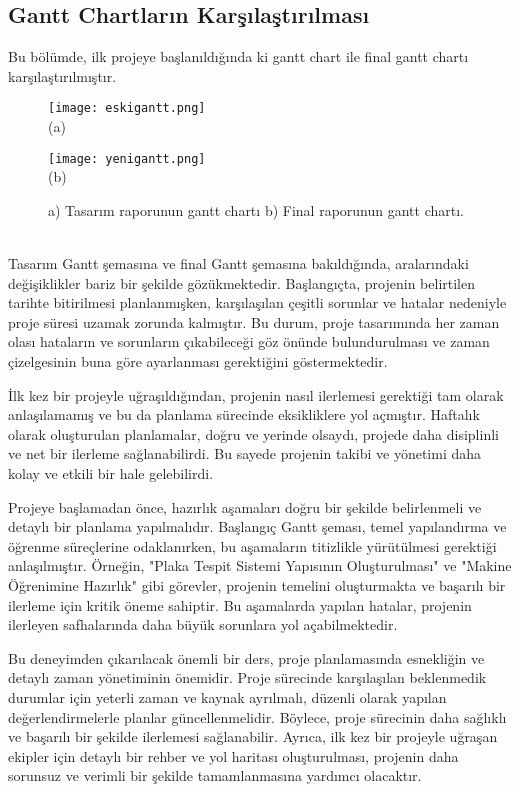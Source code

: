 \documentclass[]{article}
\begin{document}
	\subsection{Gantt Chartların Karşılaştırılması}
	Bu bölümde, ilk projeye başlanıldığında ki gantt chart ile final gantt chartı karşılaştırılmıştır.
	\begin{figure}[!ht]
		\centering
		\texttt{[image: eskigantt.png]}
		\\
		(a)
	\end{figure}
	\begin{figure}[!ht]
		\centering
		\texttt{[image: yenigantt.png]}
		\\
		 (b)
		\caption{
			{a) Tasarım raporunun gantt chartı}
			{b) Final raporunun gantt chartı.}}
	\end{figure}
	\\
	Tasarım Gantt şemasına ve final Gantt şemasına bakıldığında, aralarındaki değişiklikler bariz bir şekilde gözükmektedir. Başlangıçta, projenin belirtilen tarihte bitirilmesi planlanmışken, karşılaşılan çeşitli sorunlar ve hatalar nedeniyle proje süresi uzamak zorunda kalmıştır. Bu durum, proje tasarımında her zaman olası hataların ve sorunların çıkabileceği göz önünde bulundurulması ve zaman çizelgesinin buna göre ayarlanması gerektiğini göstermektedir.

	İlk kez bir projeyle uğraşıldığından, projenin nasıl ilerlemesi gerektiği tam olarak anlaşılamamış ve bu da planlama sürecinde eksikliklere yol açmıştır. Haftalık olarak oluşturulan planlamalar, doğru ve yerinde olsaydı, projede daha disiplinli ve net bir ilerleme sağlanabilirdi. Bu sayede projenin takibi ve yönetimi daha kolay ve etkili bir hale gelebilirdi.

	Projeye başlamadan önce, hazırlık aşamaları doğru bir şekilde belirlenmeli ve detaylı bir planlama yapılmalıdır. Başlangıç Gantt şeması, temel yapılandırma ve öğrenme süreçlerine odaklanırken, bu aşamaların titizlikle yürütülmesi gerektiği anlaşılmıştır. Örneğin, "Plaka Tespit Sistemi Yapısının Oluşturulması" ve "Makine Öğrenimine Hazırlık" gibi görevler, projenin temelini oluşturmakta ve başarılı bir ilerleme için kritik öneme sahiptir. Bu aşamalarda yapılan hatalar, projenin ilerleyen safhalarında daha büyük sorunlara yol açabilmektedir.

	Bu deneyimden çıkarılacak önemli bir ders, proje planlamasında esnekliğin ve detaylı zaman yönetiminin önemidir. Proje sürecinde karşılaşılan beklenmedik durumlar için yeterli zaman ve kaynak ayrılmalı, düzenli olarak yapılan değerlendirmelerle planlar güncellenmelidir. Böylece, proje sürecinin daha sağlıklı ve başarılı bir şekilde ilerlemesi sağlanabilir. Ayrıca, ilk kez bir projeyle uğraşan ekipler için detaylı bir rehber ve yol haritası oluşturulması, projenin daha sorunsuz ve verimli bir şekilde tamamlanmasına yardımcı olacaktır. 
\end{document}
